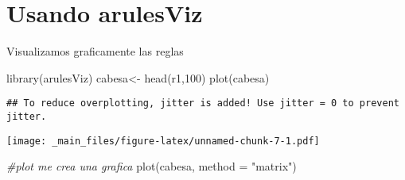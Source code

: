 \documentclass[
]{book}
\newenvironment{Shaded}{\begin{snugshade}}{\end{snugshade}}
\newcommand{\AttributeTok}[1]{\textcolor[rgb]{0.77,0.63,0.00}{#1}}
\newcommand{\CommentTok}[1]{\textcolor[rgb]{0.56,0.35,0.01}{\textit{#1}}}
\newcommand{\DecValTok}[1]{\textcolor[rgb]{0.00,0.00,0.81}{#1}}
\newcommand{\FunctionTok}[1]{\textcolor[rgb]{0.00,0.00,0.00}{#1}}
\newcommand{\NormalTok}[1]{#1}
\newcommand{\OtherTok}[1]{\textcolor[rgb]{0.56,0.35,0.01}{#1}}
\newcommand{\StringTok}[1]{\textcolor[rgb]{0.31,0.60,0.02}{#1}}
\begin{document}
\hypertarget{usando-arulesviz}{%
\section{Usando arulesViz}\label{usando-arulesviz}}

Visualizamos graficamente las reglas

\begin{Shaded}
\begin{Highlighting}[]
\FunctionTok{library}\NormalTok{(arulesViz)}
\NormalTok{cabesa}\OtherTok{\textless{}{-}} \FunctionTok{head}\NormalTok{(r1,}\DecValTok{100}\NormalTok{)}
\FunctionTok{plot}\NormalTok{(cabesa)}
\end{Highlighting}
\end{Shaded}

\begin{verbatim}
## To reduce overplotting, jitter is added! Use jitter = 0 to prevent jitter.
\end{verbatim}

\texttt{[image: \_main\_files/figure-latex/unnamed-chunk-7-1.pdf]}

\begin{Shaded}
\begin{Highlighting}[]
\CommentTok{\#plot me crea una grafica}
\FunctionTok{plot}\NormalTok{(cabesa, }\AttributeTok{method =} \StringTok{"matrix"}\NormalTok{)}
\end{Highlighting}
\end{Shaded}
\end{document}
